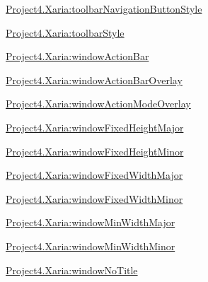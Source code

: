 {\ttfamily \hyperlink{classproject4_1_1xaria_1_1R_1_1styleable_ae547053c95c192e4f25178aa4530ee6a}{Project4.\+Xaria\+:toolbar\+Navigation\+Button\+Style}}

{\ttfamily \hyperlink{classproject4_1_1xaria_1_1R_1_1styleable_a77e2df5acbe372a663d1ccbcf26269ee}{Project4.\+Xaria\+:toolbar\+Style}}

{\ttfamily \hyperlink{classproject4_1_1xaria_1_1R_1_1styleable_a63da97bf5664857a9e2d0b8f5ba65d80}{Project4.\+Xaria\+:window\+Action\+Bar}}

{\ttfamily \hyperlink{classproject4_1_1xaria_1_1R_1_1styleable_a06afb482b15287963396e764ae69b472}{Project4.\+Xaria\+:window\+Action\+Bar\+Overlay}}

{\ttfamily \hyperlink{classproject4_1_1xaria_1_1R_1_1styleable_a90154482a964f6451f06f63075d14158}{Project4.\+Xaria\+:window\+Action\+Mode\+Overlay}}

{\ttfamily \hyperlink{classproject4_1_1xaria_1_1R_1_1styleable_afbfad678390f6ef619822aaa4c394909}{Project4.\+Xaria\+:window\+Fixed\+Height\+Major}}

{\ttfamily \hyperlink{classproject4_1_1xaria_1_1R_1_1styleable_a9110b2aa58050cacc46ad38d156924e2}{Project4.\+Xaria\+:window\+Fixed\+Height\+Minor}}

{\ttfamily \hyperlink{classproject4_1_1xaria_1_1R_1_1styleable_ad301f019de6ddcbce43d7e5d1f6e3e25}{Project4.\+Xaria\+:window\+Fixed\+Width\+Major}}

{\ttfamily \hyperlink{classproject4_1_1xaria_1_1R_1_1styleable_afc006d05a67568d40092e9c8b6d65ca5}{Project4.\+Xaria\+:window\+Fixed\+Width\+Minor}}

{\ttfamily \hyperlink{classproject4_1_1xaria_1_1R_1_1styleable_a1800907132f2a32eb4cf09127ecc7edc}{Project4.\+Xaria\+:window\+Min\+Width\+Major}}

{\ttfamily \hyperlink{classproject4_1_1xaria_1_1R_1_1styleable_af7746fda2052e3559e17aae4ea7bd140}{Project4.\+Xaria\+:window\+Min\+Width\+Minor}}

{\ttfamily \hyperlink{classproject4_1_1xaria_1_1R_1_1styleable_ad3263d106700d1119508ee7eae3c01e2}{Project4.\+Xaria\+:window\+No\+Title}}

